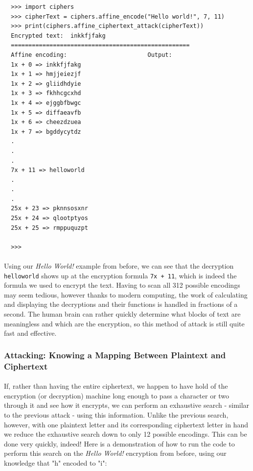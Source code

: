 \documentclass[12pt,a4paper]{article}
\begin{document}
\begin{verbatim}
  >>> import ciphers
  >>> cipherText = ciphers.affine_encode("Hello world!", 7, 11)
  >>> print(ciphers.affine_ciphertext_attack(cipherText))
  Encrypted text:  inkkfjfakg
  ===================================================
  Affine encoding:                       Output:     
  1x + 0 => inkkfjfakg
  1x + 1 => hmjjeiezjf
  1x + 2 => gliidhdyie
  1x + 3 => fkhhcgcxhd
  1x + 4 => ejggbfbwgc
  1x + 5 => diffaeavfb
  1x + 6 => cheezdzuea
  1x + 7 => bgddycytdz
  .
  .
  .
  7x + 11 => helloworld
  .
  .
  .
  25x + 23 => pknnsosxnr
  25x + 24 => qlootptyos
  25x + 25 => rmppuquzpt

  >>>
\end{verbatim}

\paragraph{}
Using our \textit{Hello World!} example from before, we can see that the 
decryption \verb|helloworld| shows up at the encryption formula 
\verb|7x + 11|, which is indeed the formula we used to encrypt the text.  
Having to scan all 312 possible encodings may seem tedious, however thanks 
to modern computing, the work of calculating and displaying the decryptions and 
their functions is handled in fractions of a second.  The human brain can 
rather quickly determine what blocks of text are meaningless and which are 
the encryption, so this method of attack is still quite fast and effective.

\subsubsection{Attacking:  Knowing a Mapping Between Plaintext and Ciphertext}
\paragraph{}
If, rather than having the entire ciphertext, we happen to have hold of the 
encryption (or decryption) machine long enough to pass a character or two 
through it and see how it encrypts, we can perform an exhaustive search - 
similar to the previous attack - using this information.  Unlike the previous search, 
however, with one plaintext letter and its corresponding ciphertext letter in 
hand we reduce the exhaustive search down to only 12 possible encodings.  
This can be done very quickly, indeed!  Here is a demonstration of how to run 
the code to perform this search on the \textit{Hello World!} encryption from 
before, using our knowledge that "h" encoded to "i":
\end{document}
